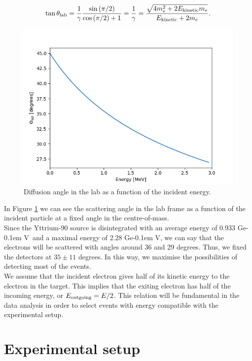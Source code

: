 \documentclass[10pt,swedish, openany]{book}
\def\MeV{\ifmmode {\mathrm{\ Me\kern -0.1em V}}\else
                   \textrm{Ge\kern -0.1em V}\fi}%
\begin{document}
\begin{equation}
    \tan{\theta_{\rm lab}}= \frac{1}{\gamma}\frac{\sin{(\pi/2)}}{\cos{(\pi/2)}+1} = \frac{1}{\gamma} = \frac{\sqrt{4m_e^2 + 2 E_{\rm kinetic}m_e}}{E_{\rm kinetic}+2m_e}.
\end{equation}

\begin{figure}[h]
\includegraphics[scale=0.5]{theta.png}
\centering
\caption{Diffusion angle in the lab as a function of the incident energy.}
\label{fig:theta}
\end{figure}

In Figure \ref{fig:theta} we can see the scattering angle in the lab frame as a function of the incident particle at a fixed angle in the centre-of-mass.\\

Since the Yttrium-90 source is disintegrated with an average energy of 0.933 \MeV~and a maximal energy of 2.28 \MeV, we can say that the electrons will be scattered with angles around 36 and 29 degrees. Thus, we fixed the detectors at $35 \pm 11$ degrees. In this way, we maximise the possibilities of detecting most of the events. \\

We assume that the incident electron gives half of its kinetic energy to the electron in the target. This implies that the exiting electron has half of the incoming energy,  or $E_{\rm outgoing} = E/2$. This relation will be fundamental in the data analysis in order to select events with energy compatible with the experimental setup.

\chapter{Experimental setup}
\end{document}

